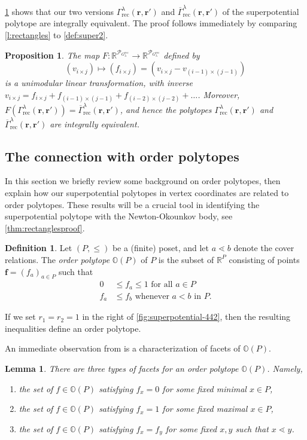 \documentclass{amsart}
\newtheorem{lemma}[thm]{Lemma}
\newtheorem{proposition}[thm]{Proposition}
\theoremstyle{definition}
\newtheorem{definition}[thm]{Definition}
\numberwithin{equation}{section}
\newcommand{\rr}{\mathbf r}
\newcommand{\R}{\mathbb R}
\newcommand{\rect}{\mathrm{rec}}
\newcommand{\OO}{\mathbb{O}}
\newcommand{\rGamma}{\overline{\Gamma}}
\begin{document}
\cref{p:unimodular} shows that 
our two versions 
$\Gamma_{\rect}^\lambda(\rr,\rr')$   and
$\rGamma_{\rect}^\lambda(\rr,\rr')$ of
the superpotential
polytope 
are integrally equivalent.
The proof follows immediately by comparing 
\cref{l:rectangles} to \cref{def:super2}.
\begin{proposition}\label{p:unimodular}
The map $F:\R^{\mathcal P_{G^{\rect}_{\lambda}}}\to \R^{\mathcal P_{G^{\rect}_{\lambda}}}$ defined by
\[
(v_{i\times j})\mapsto (f_{i \times j}) = ( v_{i \times j} - v_{(i-1)\times (j-1)})
\]
is a unimodular linear transformation, with inverse 
$v_{i \times j} = f_{i \times j} + f_{(i-1) \times (j-1)} + 
f_{(i-2) \times (j-2)} + \dots$.
 Moreover, 
$F(\Gamma_{\rect}^\lambda(\rr,\rr'))=
\rGamma_{\rect}^\lambda(\rr,\rr')$, and hence the  polytopes
$\Gamma_{\rect}^\lambda(\rr,\rr')$  and
$\rGamma_{\rect}^\lambda(\rr,\rr')$ are integrally equivalent.
\end{proposition}





\subsection{The connection with order polytopes}\label{s:order}
In this section we briefly review some background on order polytopes, then 
explain how our superpotential polytopes in vertex coordinates
are related to order polytopes.  These results will be a crucial tool in identifying
the superpotential polytope with the Newton-Okounkov body, 
see
 \cref{thm:rectanglesproof}.

\begin{definition}\label{def:order}\cite{order}
	Let $(P, \leq)$ be a (finite) poset, and let $a \lessdot b$ denote the cover relations.
	The \emph{order polytope} $\OO(P)$ 
	of $P$ is the subset of $\R^P$ consisting
	of points $\mathbf{f} = (f_a)_{a\in P}$ such that
	\begin{align}
		0 &\leq f_a \leq 1 \text{ for all } a\in P\label{e:OrderPolytope1}\\
		f_a & \leq f_b \text{ whenever } a<b \text{ in }P.\label{e:OrderPolytope2}
	\end{align}
\end{definition}

If we set $r_1=r_2=1$ in the right of 
\cref{fig:superpotential-442},
then the resulting inequalities define
 an order polytope.

An immediate observation from \cite[Section 1]{order} is a characterization
of facets of $\OO(P)$.
\begin{lemma}\label{lem:facets}
	There are three types of facets for an order polytope $\OO(P)$. Namely,
	\begin{enumerate}
	\item the set of $f\in \OO(P)$ satisfying $f_x=0$ for some fixed minimal $x\in P$,
\item the set of $f\in \OO(P)$ satisfying $f_x=1$ for some fixed maximal $x\in P$,
\item the set of $f\in \OO(P)$ satisfying $f_x=f_y$ for some fixed $x,y$ such that $x\lessdot y$.
	\end{enumerate}	
\end{lemma}
\end{document}
